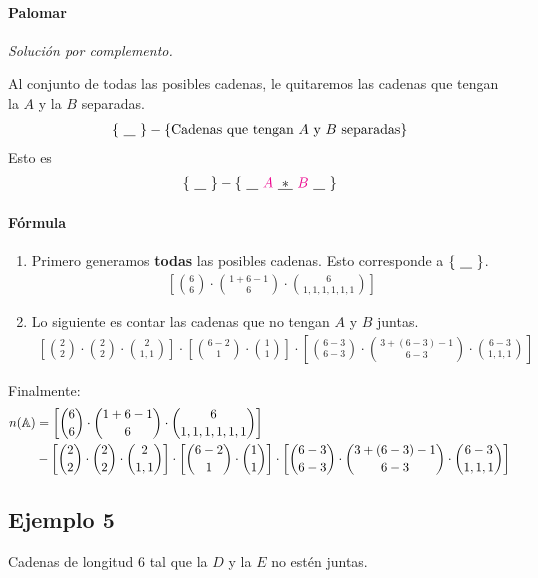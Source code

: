 \paragraph{Palomar}
\textit{Solución por complemento.}

Al conjunto de todas las posibles cadenas, le quitaremos las cadenas que tengan la $A$ y la $B$ separadas.
\begin{align*}
\left\{~\underline{\hspace{0.3cm}}~\right\}-\left\{\text{Cadenas que tengan $A$ y $B$ separadas}\right\}
\end{align*}
Esto es
\begin{align*}
\left\{~\underline{\hspace{0.3cm}}~\right\}-\left\{~\underline{\hspace{0.3cm}}~ {\color{magenta}A} ~\underline{\hspace{0.1cm}*\hspace{0.1cm}}~ {\color{magenta}B} ~\underline{\hspace{0.3cm}}~ \right\}
\end{align*}
\paragraph{Fórmula}
\begin{enumerate}
\item Primero generamos \textbf{todas} las posibles cadenas. Esto corresponde a $\left\{ ~\underline{\hspace{0.3cm}}~ \right\}$.
\begin{align*}
\left[\binom{6}{6}\cdot\binom{1+6-1}{6}\cdot\binom{6}{1,1,1,1,1,1}\right]
\end{align*}
\item Lo siguiente es contar las cadenas que no tengan $A$ y $B$ juntas.
\begin{align*}
\left[\binom{2}{2}\cdot\binom{2}{2}\cdot \binom{2}{1,1}\right]\cdot\left[\binom{6-2}{1}\cdot\binom{1}{1}\right]\cdot\left[\binom{6-3}{6-3}\cdot\binom{3+(6-3)-1}{6-3}\cdot\binom{6-3}{1,1,1}\right]
\end{align*}
\end{enumerate}

Finalmente:
\begin{align*}
n(\mathbb{A})&=\left[\binom{6}{6}\cdot\binom{1+6-1}{6}\cdot\binom{6}{1,1,1,1,1,1}\right]\\
&-\left[\binom{2}{2}\cdot\binom{2}{2}\cdot \binom{2}{1,1}\right]\cdot\left[\binom{6-2}{1}\cdot\binom{1}{1}\right]\cdot\left[\binom{6-3}{6-3}\cdot\binom{3+(6-3)-1}{6-3}\cdot\binom{6-3}{1,1,1}\right]
\end{align*}

\subsection{Ejemplo 5}
Cadenas de longitud 6 tal que la $D$ y la $E$ no estén juntas.


